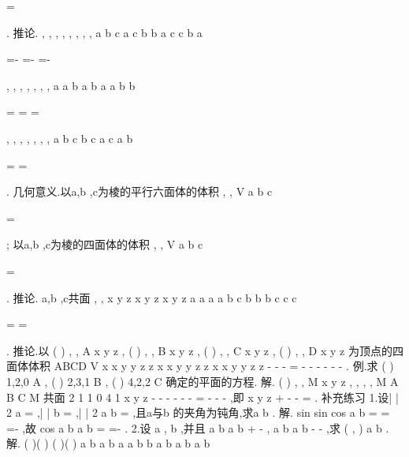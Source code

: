 =


\rho 
\rho 
\rho 
. 
\textcolor{lyred}{推论}.
, ,
, ,
, ,
, ,
a b c
a c b
b a c
c b a








=-
=-
=-








\rho 
\rho 
\rho 
\rho 
\rho 
\rho 
\rho \rho 
\rho \rho 
\rho 
\rho , 
, ,
, ,
, ,
a a b
a b a
a b b






=
=
=






\rho 
\rho 
\rho \rho 
\rho \rho 
\rho 
\rho 
\rho 
,
, ,
, ,
, ,
a b c
b c a
c a b






=
=






\rho 
\rho 
\rho 
\rho 
\rho 
\rho \rho 
\rho \rho 
. 
\textcolor{lyred}{几何意义}.以a\rho ,b
\rho 
,c\rho 为棱的平行六面体的体积
, ,
V
a b c


=

\rho 
\rho 
\rho 
; 
以a\rho ,b
\rho 
,c\rho 为棱的四面体的体积
, ,
V
a b c


=


\rho 
\rho 
\rho 
. 
\textcolor{lyred}{推论}. a\rho ,b
\rho 
,c\rho 共面
, ,
x
y
z
x
y
z
x
y
z
a
a
a
a b c
b
b
b
c
c
c


\Leftrightarrow 
=
\Leftrightarrow 
=


\rho 
\rho 
\rho 
. 
\textcolor{lyred}{推论}.以
(
)
,
,
A x y z
,
(
)
,
,
B x
y
z
, (
)
,
,
C x y z
,
(
)
,
,
D x y z
为顶点的四面体体积 
ABCD
V
x
x
y
y
z
z
x
x
y
y
z
z
x
x
y
y
z
z
-
-
-
=
-
-
-
-
-
-
. 
\textcolor{lyred}{例}.求
(
)
1,2,0
A
,
(
)
2,3,1
B
,
(
)
4,2,2
C
确定的平面\Pi 的方程. 
解.
(
)
, ,
M x y z
\forall 
,
, ,
,
M
A B C M
\in \Pi \Leftrightarrow 
共面
2 1
1 0
4 1
x
y
z
-
-
-
\Leftrightarrow 
-
-
-
=
-
-
-
,即 
x
y
z
+
-
-
=
. 
\textcolor{lyred}{补充练习 }
1.设|
| 2
a =
\rho 
,|
|
b =
\rho 
,|
| 2
a
b
\times 
=
\rho 
\rho 
,且a\rho 与b
\rho 
的夹角\theta 为钝角,求a b
\cdots 
\rho 
\rho 
. 
解.
sin
sin
cos
a b
\theta 
\theta 
\theta 
=
\Rightarrow 
=
\Rightarrow 
=-
\rho 
\rho 
,故
cos
a b
a b
\theta 
\cdots 
=
=-
\rho 
\rho 
\rho 
\rho 
. 
2.设
a \neq 
\rho 
\rho 
,
b \neq 
\rho 
\rho 
,并且
a
b
a
b
+
\bot
-
\rho 
\rho 
\rho 
\rho 
,
a
b
a
b
-
\bot
-
\rho 
\rho 
\rho 
\rho 
,求\cdot 
( , )
a b
\rho 
\rho 
. 
解. (
)(
)
(
)(
)
a
b
a
b
a
a b
b
a b
a
b
a
b


